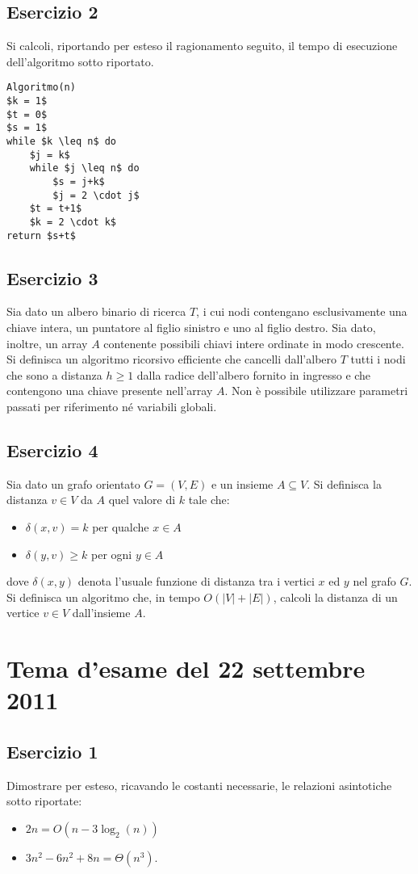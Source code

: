 \documentclass[11pt,a4paper,oneside]{article}
\begin{document}
\subsection*{Esercizio 2} Si calcoli, riportando per esteso il ragionamento seguito, il tempo di esecuzione dell'algoritmo sotto riportato.

\begin{lstlisting}[mathescape=true]
Algoritmo(n)
$k = 1$
$t = 0$
$s = 1$
while $k \leq n$ do
	$j = k$
	while $j \leq n$ do
		$s = j+k$
		$j = 2 \cdot j$
	$t = t+1$
	$k = 2 \cdot k$
return $s+t$
\end{lstlisting}

\subsection*{Esercizio 3} Sia dato un albero binario di ricerca $T$, i cui nodi contengano esclusivamente una chiave intera, un puntatore al figlio sinistro e uno al figlio destro. Sia dato, inoltre, un array $A$ contenente possibili chiavi intere ordinate in modo crescente.\\Si definisca un algoritmo ricorsivo efficiente che cancelli dall'albero $T$ tutti i nodi che sono a distanza $h\geq 1$ dalla radice dell'albero fornito in ingresso e che contengono una chiave presente nell'array $A$. Non è possibile utilizzare parametri passati per riferimento né variabili globali.
\subsection*{Esercizio 4} Sia dato un grafo orientato $G=(V,E)$ e un insieme $A \subseteq V$. Si definisca la distanza $v \in V$ da $A$ quel valore di $k$ tale che:
\begin{itemize}
	\item $\delta(x,v) = k$  per qualche $x \in A$
	\item $\delta(y, v) \geq k$ per ogni $y \in A$
\end{itemize}
dove $\delta(x,y)$ denota l'usuale funzione di distanza tra i vertici $x$ ed $y$ nel grafo $G$. Si definisca un algoritmo che, in tempo $O(|V|+|E|)$, calcoli la distanza di un vertice $v \in V$ dall'insieme $A$.
\pagebreak
%
%
\section*{Tema d'esame del 22 settembre 2011}
\subsection*{Esercizio 1} Dimostrare per esteso, ricavando le costanti necessarie, le relazioni asintotiche sotto riportate:
\begin{itemize}
	\item $2n = O(n-3\log_2(n))$
	\item $3n^2 -6n^2+8n = \Theta(n^3)$.
\end{itemize}
\end{document}
